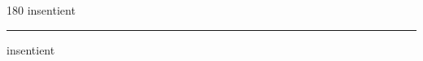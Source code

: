 
\begin{frame}
\begin{center}
\begin{turn}{180}
{\fontsize{2.5cm}{1em}\selectfont insentient}
\end{turn}
\vspace{1em}\par  
\hrule
\vspace{1em}\par  
{\fontsize{2.5cm}{1em}\selectfont insentient}
\end{center}
\end{frame}
